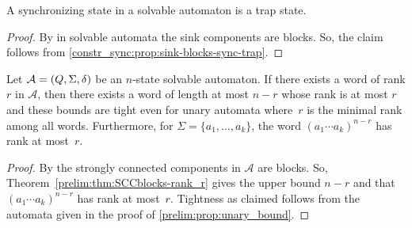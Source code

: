 \begin{proposition}
	\label{constr_sync:cor:solvable_sync_iff_reach_trap} \label{constr_sync:prop:solvable_sync_iff_reach_trap}
	A synchronizing state in a solvable automaton
	is a trap state.	
\end{proposition}
\begin{proof}
	By 
	in solvable automata the sink components are blocks.
	So, the claim follows from \cref{constr_sync:prop:sink-blocks-sync-trap}.  
\end{proof}

\begin{theorem}
	\label{prelim:thm:solvrank_r}
	Let $\mathcal A = (Q, \Sigma, \delta)$ be an $n$-state solvable
	automaton. If there exists a word of rank $r$ in $\mathcal A$,
	then there exists a word of length
	at most $n - r$ whose rank is at most $r$ 
	and these bounds are tight even for unary automata where~$r$
	is the minimal rank among all words. Furthermore, for $\Sigma = \{a_1, \ldots, a_k\}$,
	the word $(a_1 \cdots a_k)^{n - r}$
	has rank at most~$r$.
\end{theorem}
\begin{proof} 
	By 
	the strongly connected components in $\mathcal A$
	are blocks.
	So, Theorem~\ref{prelim:thm:SCCblocks-rank_r}
	gives the upper bound $n - r$
	and that $(a_1 \cdots a_k)^{n - r}$ 
	has rank at most~$r$.
	Tightness as claimed follows from the automata
	given in the proof of \cref{prelim:prop:unary_bound}.
\end{proof}

